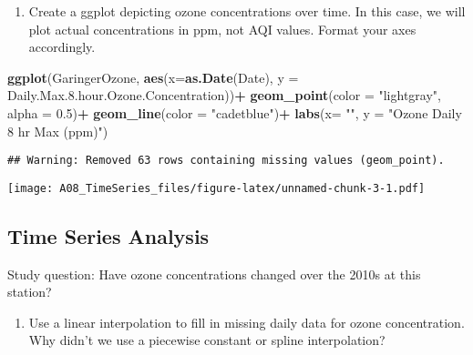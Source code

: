\documentclass[
]{article}
\newenvironment{Shaded}{\begin{snugshade}}{\end{snugshade}}
\newcommand{\DataTypeTok}[1]{\textcolor[rgb]{0.13,0.29,0.53}{#1}}
\newcommand{\FloatTok}[1]{\textcolor[rgb]{0.00,0.00,0.81}{#1}}
\newcommand{\KeywordTok}[1]{\textcolor[rgb]{0.13,0.29,0.53}{\textbf{#1}}}
\newcommand{\NormalTok}[1]{#1}
\newcommand{\OperatorTok}[1]{\textcolor[rgb]{0.81,0.36,0.00}{\textbf{#1}}}
\newcommand{\StringTok}[1]{\textcolor[rgb]{0.31,0.60,0.02}{#1}}
\providecommand{\tightlist}{%
  \setlength{\itemsep}{0pt}\setlength{\parskip}{0pt}}
\begin{document}
\begin{enumerate}
\def\labelenumi{\arabic{enumi}.}
\setcounter{enumi}{6}
\tightlist
\item
  Create a ggplot depicting ozone concentrations over time. In this
  case, we will plot actual concentrations in ppm, not AQI values.
  Format your axes accordingly.
\end{enumerate}

\begin{Shaded}
\begin{Highlighting}[]
\KeywordTok{ggplot}\NormalTok{(GaringerOzone, }\KeywordTok{aes}\NormalTok{(}\DataTypeTok{x=}\KeywordTok{as.Date}\NormalTok{(Date), }\DataTypeTok{y =}\NormalTok{ Daily.Max.}\FloatTok{8.}\NormalTok{hour.Ozone.Concentration))}\OperatorTok{+}
\StringTok{  }\KeywordTok{geom_point}\NormalTok{(}\DataTypeTok{color =} \StringTok{"lightgray"}\NormalTok{, }\DataTypeTok{alpha =} \FloatTok{0.5}\NormalTok{)}\OperatorTok{+}
\StringTok{  }\KeywordTok{geom_line}\NormalTok{(}\DataTypeTok{color =} \StringTok{"cadetblue"}\NormalTok{)}\OperatorTok{+}
\StringTok{  }\KeywordTok{labs}\NormalTok{(}\DataTypeTok{x=} \StringTok{""}\NormalTok{, }\DataTypeTok{y =} \StringTok{"Ozone Daily 8 hr Max (ppm)"}\NormalTok{)}
\end{Highlighting}
\end{Shaded}

\begin{verbatim}
## Warning: Removed 63 rows containing missing values (geom_point).
\end{verbatim}

\texttt{[image: A08\_TimeSeries\_files/figure-latex/unnamed-chunk-3-1.pdf]}

\hypertarget{time-series-analysis}{%
\subsection{Time Series Analysis}\label{time-series-analysis}}

Study question: Have ozone concentrations changed over the 2010s at this
station?

\begin{enumerate}
\def\labelenumi{\arabic{enumi}.}
\setcounter{enumi}{7}
\tightlist
\item
  Use a linear interpolation to fill in missing daily data for ozone
  concentration. Why didn't we use a piecewise constant or spline
  interpolation?
\end{enumerate}
\end{document}
